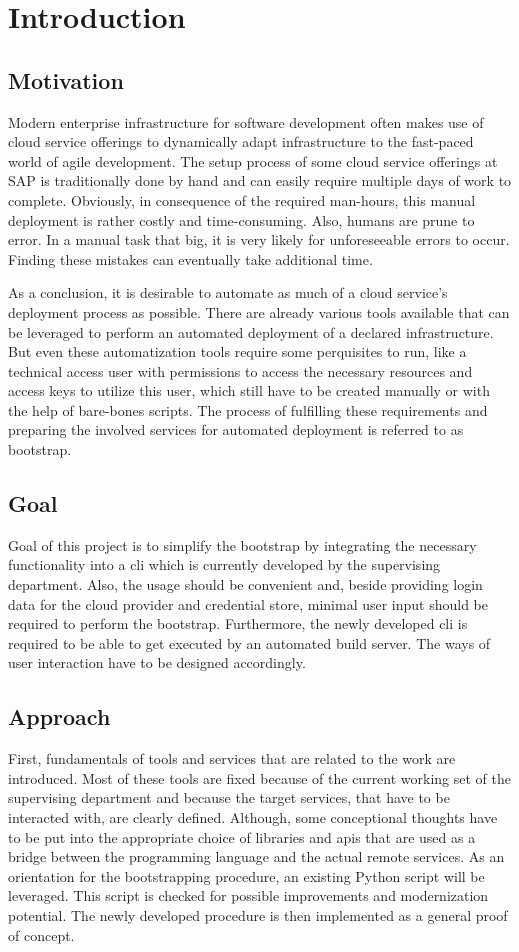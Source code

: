 \chapter{Introduction}
\section{Motivation}
Modern enterprise infrastructure for software development often makes use of cloud service offerings to dynamically adapt infrastructure to the fast-paced world of agile development.
The setup process of some cloud service offerings at SAP is traditionally done by hand and can easily require multiple days of work to complete.
Obviously, in consequence of the required man-hours, this manual deployment is rather costly and time-consuming.
Also, humans are prune to error.
In a manual task that big, it is very likely for unforeseeable errors to occur.
Finding these mistakes can eventually take additional time.

As a conclusion, it is desirable to automate as much of a cloud service's deployment process as possible.
There are already various tools available that can be leveraged to perform an automated deployment of a declared infrastructure.
But even these automatization tools require some perquisites to run, like a technical access user with permissions to access the necessary resources and access keys to utilize this user, which still have to be created manually or with the help of bare-bones scripts.
The process of fulfilling these requirements and preparing the involved services for automated deployment is referred to as bootstrap.

\section{Goal}
Goal of this project is to simplify the bootstrap by integrating the necessary functionality into a \acf{cli} which is currently developed by the supervising department.
Also, the usage should be convenient and, beside providing login data for the cloud provider and credential store, minimal user input should be required to perform the bootstrap.
Furthermore, the newly developed \ac{cli} is required to be able to get executed by an automated build server.
The ways of user interaction have to be designed accordingly.

\section{Approach}
First, fundamentals of tools and services that are related to the work are introduced.
Most of these tools are fixed because of the current working set of the supervising department and because the target services, that have to be interacted with, are clearly defined.
Although, some conceptional thoughts have to be put into the appropriate choice of libraries and \acp{api} that are used as a bridge between the programming language and the actual remote services.
As an orientation for the bootstrapping procedure, an existing Python script will be leveraged.
This script is checked for possible improvements and modernization potential.
The newly developed procedure is then implemented as a general proof of concept.

